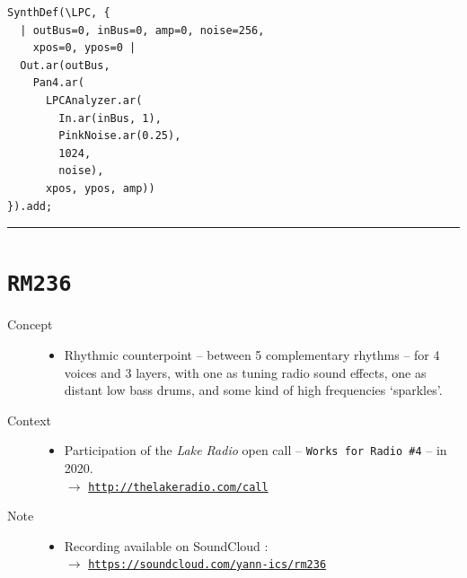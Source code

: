 \begin{description}
\begin{itemize}
\smallskip

\begin{lstlisting}
SynthDef(\LPC, {
  | outBus=0, inBus=0, amp=0, noise=256, 
    xpos=0, ypos=0 |
  Out.ar(outBus, 
    Pan4.ar(
      LPCAnalyzer.ar(
        In.ar(inBus, 1), 
        PinkNoise.ar(0.25), 
        1024, 
        noise), 
      xpos, ypos, amp))
}).add;
\end{lstlisting}
\end{itemize}
\end{description}

\bigskip

\begin{center}\rule{0.5\linewidth}{0.5pt}\end{center}

\bigskip


\section*{\texttt{RM236}}


\bigskip

\begin{description}
\item[Concept] \hfill 
\begin{itemize}
\item[] Rhythmic counterpoint -- between 5 complementary rhythms -- for 4 voices and 3 layers, with one as tuning radio sound effects, one as distant low bass drums, and some kind of high frequencies `sparkles'.
\end{itemize}
\bigskip
\item[Context] \hfill 
\begin{itemize}
\item[] Participation of the \textit{Lake Radio} open call -- \texttt{Works for Radio \#4} -- in 2020. \\
$\rightarrow$ \href{http://thelakeradio.com/call}{\texttt{\small http://thelakeradio.com/call}}
\end{itemize}
\item[Note] \hfill 
\begin{itemize}
\item[] Recording available on SoundCloud : \\
$\rightarrow$ \href{https://soundcloud.com/yann-ics/rm236}{\texttt{\small https://soundcloud.com/yann-ics/rm236}}
\end{itemize}
\end{description}


